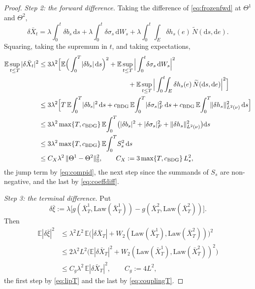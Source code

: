 \documentclass[preprint,12pt]{elsarticle}
\newcommand{\E}{\mathbb{E}}
\newcommand{\diff}{\mathrm{d}}
\newcommand{\Nt}{\widetilde{N}}
\newcommand{\Lnu}{L^2(\nu)}
\newcommand{\Law}{\mathrm{Law}}
\newcommand{\HH}{\mathbb{S}}
\newcommand{\Lnorm}[1]{\lVert #1\rVert_{\Lnu}}
\numberwithin{equation}{section}
\theoremstyle{plain}
\theoremstyle{definition}
\theoremstyle{\PaperRemarkStyle}
\begin{document}
\begin{proof}
\emph{Step 2: the forward difference.} Taking the difference of \eqref{eq:frozenfwd} at
$\Theta^1$ and $\Theta^2$,
\[
\delta\bar X_t=\lambda\!\int_0^t\!\delta b_s\,\diff s+\lambda\!\int_0^t\!\delta\sigma_s\,\diff W_s
+\lambda\!\int_0^t\!\!\int_E\delta h_s(e)\,\Nt(\diff s,\diff e) .
\]
Squaring, taking the supremum in $t$, and taking expectations,
\begin{equation}\label{eq:fwddiff}
\begin{aligned}
\E\sup_{t\le T}|\delta\bar X_t|^2
&\le 3\lambda^2\Big[\E\Big(\int_0^T\!|\delta b_s|\,\diff s\Big)^{2}
+\E\sup_{t\le T}\Big|\int_0^t\!\delta\sigma_s\,\diff W_s\Big|^{2}\\
&\hspace{13.4em}+\E\sup_{t\le T}\Big|\int_0^t\!\!\int_E\delta h_s(e)\,\Nt(\diff s,\diff e)\Big|^{2}\Big]\\
&\le 3\lambda^2\Big[T\,\E\!\int_0^T\!|\delta b_s|^2\,\diff s
+c_{\mathrm{BDG}}\,\E\!\int_0^T\!|\delta\sigma_s|_F^2\,\diff s
+c_{\mathrm{BDG}}\,\E\!\int_0^T\!\Lnorm{\delta h_s}^2\,\diff s\Big]\\
&\le 3\lambda^2\max\{T,c_{\mathrm{BDG}}\}\,
\E\!\int_0^T\!\big(|\delta b_s|^2+|\delta\sigma_s|_F^2+\Lnorm{\delta h_s}^2\big)\diff s\\
&\le 3\lambda^2\max\{T,c_{\mathrm{BDG}}\}\,\E\!\int_0^T\! S_s^2\,\diff s\\
&\le C_X\lambda^2\,\|\Theta^1-\Theta^2\|_{\HH}^2 ,
\qquad C_X:=3\max\{T,c_{\mathrm{BDG}}\}\,L_\star^2 ,
\end{aligned}
\end{equation}
the jump term by \eqref{eq:compid}, the next step since the summands of $S_s$ are
non-negative, and the last by \eqref{eq:coeffdiff}.

\emph{Step 3: the terminal difference.} Put
\[
\delta\bar\xi:=\lambda\big[g(\bar X^1_T,\Law(\bar X^1_T))-g(\bar X^2_T,\Law(\bar X^2_T))\big].
\]
Then
\begin{equation}\label{eq:terdiff}
\begin{aligned}
\E|\delta\bar\xi|^2
&\le\lambda^2L^2\,\E\big(|\delta\bar X_T|+W_2(\Law(\bar X^1_T),\Law(\bar X^2_T))\big)^2\\
&\le2\lambda^2L^2\big(\E|\delta\bar X_T|^2+W_2(\Law(\bar X^1_T),\Law(\bar X^2_T))^2\big)\\
&\le C_g\lambda^2\,\E|\delta\bar X_T|^2 ,\qquad C_g:=4L^2 ,
\end{aligned}
\end{equation}
the first step by \eqref{eq:lipT} and the last by \eqref{eq:couplingT}.


\end{proof}
\end{document}
